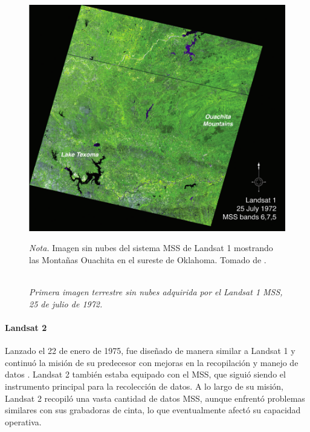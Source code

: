                     \begin{figure}[H] 
                        \caption{\doublespacing \\ \textit{Primera imagen terrestre sin nubes adquirida por el Landsat 1 MSS, 25 de julio de 1972.}} 
                        \centering
                        \includegraphics[width=1\linewidth]{2_CAPITULO2/IMG/landsat1.png}
                        \begin{justify}
                            \textit{Nota.} Imagen sin nubes del sistema MSS de Landsat 1 mostrando las Montañas Ouachita en el sureste de Oklahoma. Tomado de \textcite{landsat_legacy}.
                        \end{justify}                    
                        \label{landsat1}
                    \end{figure}

                \paragraph{Landsat 2}
                    Lanzado el 22 de enero de 1975, fue diseñado de manera similar a Landsat 1 y continuó la misión de su predecesor con mejoras en la recopilación y manejo de datos . Landsat 2 también estaba equipado con el MSS, que siguió siendo el instrumento principal para la recolección de datos. A lo largo de su misión, Landsat 2 recopiló una vasta cantidad de datos MSS, aunque enfrentó problemas similares con sus grabadoras de cinta, lo que eventualmente afectó su capacidad operativa.

